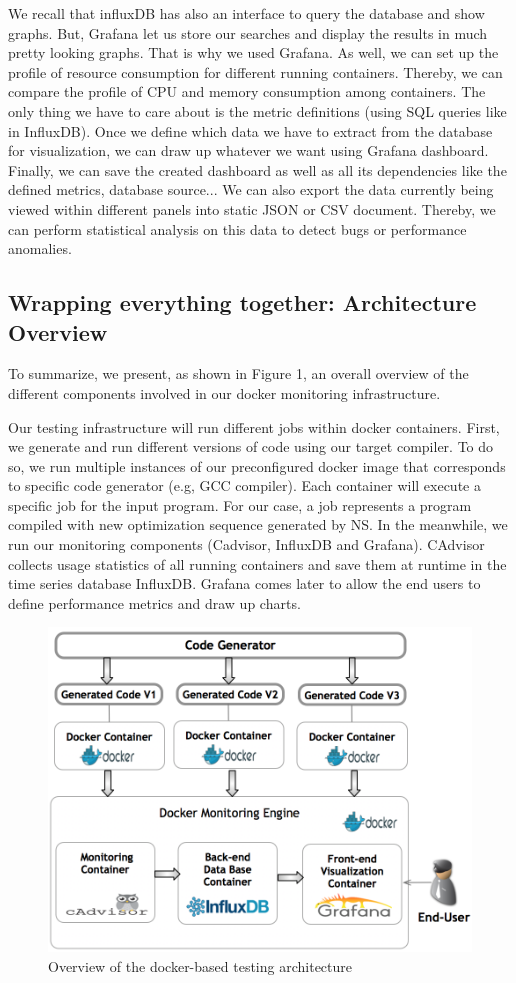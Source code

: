 We recall that influxDB has also an interface to query the database and show graphs. But, Grafana let us store our searches and display the results in much pretty looking graphs. That is why we used Grafana.
As well, we can set up the profile of resource consumption for different running
containers. Thereby, we can compare the profile of CPU and memory consumption among containers. The only thing we have to care about is the metric definitions (using SQL queries like in InfluxDB). Once we define which data we have to extract from the database for visualization, we can draw up whatever we want using Grafana dashboard. Finally, we can save the created dashboard as well as all its dependencies like the defined metrics, database source... We can also export the data currently being viewed within different
panels into static JSON or CSV document. Thereby, we can perform statistical analysis on this data to detect bugs or performance anomalies.

\subsection{Wrapping everything together: Architecture Overview}
To summarize, we present, as shown in Figure 1, an overall overview of the different components involved in our docker monitoring infrastructure.

Our testing infrastructure will run different jobs within docker containers. First, we generate and run different versions of code using our target compiler. To do so, we run multiple instances of our preconfigured docker image that corresponds to specific code generator (e.g, GCC compiler). Each container will execute a specific job for the input program. For our case, a job represents a program compiled with new optimization sequence generated by NS. In the meanwhile, we run our monitoring components (Cadvisor, InfluxDB and Grafana). CAdvisor collects usage statistics of all running containers and save them at runtime in the time series database InfluxDB. Grafana comes later to allow the end users to define performance metrics and draw up charts.
\begin{figure}[h]
	\centering
	\includegraphics[scale=0.50]{Ressources/infra.png}
	\caption{Overview of the docker-based testing architecture}
\end{figure}